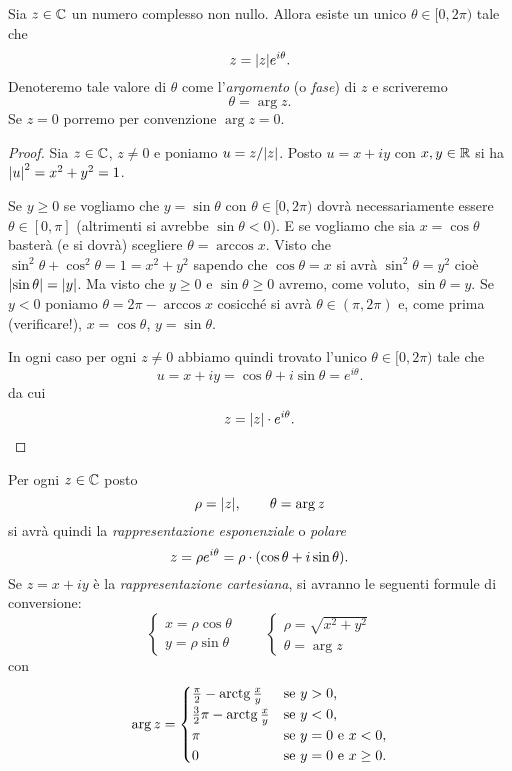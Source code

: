 \begin{theorem}[argomento]
%
Sia $z\in {\mathbb C}$ un numero complesso non nullo. Allora esiste un
unico $\theta\in [0,2\pi)$ tale che
\[
z = {\left|z\right|} e^{i\theta}.
\]
Denoteremo tale valore di $\theta$ come l'\emph{argomento}%
%
(o \emph{fase}) di $z$
e scriveremo
\[
  \theta = \arg z.
\]
Se $z=0$ porremo per convenzione $\arg z=0$.
\end{theorem}
%
\begin{proof}
Sia $z\in {\mathbb C}$, $z\neq 0$ e poniamo $u = z/{\left|z\right|}$.
Posto $u=x+iy$ con $x,y\in {\mathbb R}$ si ha ${\left|u\right|}^2 = x^2+y^2=1$.

Se $y\ge 0$ se vogliamo che $y=\sin \theta$ con $\theta\in [0,2\pi)$
dovrà necessariamente essere $\theta \in [0,\pi]$
(altrimenti si avrebbe $\sin \theta<0$).
E se vogliamo che sia $x=\cos \theta$ basterà (e si dovrà) scegliere
$\theta = \arccos x$.
Visto che $\sin^2 \theta + \cos^2\theta = 1 = x^2 + y^2$
sapendo che $\cos \theta = x$
si avrà
$\sin^2 \theta = y^2$ cioè ${\left|\sin \theta\right|}={\left|y\right|}$.
Ma visto che $y\ge 0$ e $\sin \theta\ge 0$
avremo, come voluto, $\sin \theta = y$.
Se $y<0$ poniamo $\theta = 2\pi - \arccos x$
cosicché si avrà $\theta \in (\pi, 2\pi)$
e, come prima (verificare!),
$x=\cos \theta$, $y=\sin \theta$.

In ogni caso per ogni $z\neq 0$ abbiamo quindi trovato l'unico
$\theta\in [0,2\pi)$ tale che
\[
  u
  = x + i y
  = \cos \theta + i\sin \theta
  = e^{i\theta}.
\]
da cui
\[
  z = {\left|z\right|}\cdot e^{i\theta}.
\]
\end{proof}

Per ogni $z\in {\mathbb C}$ posto
\[
  \rho = {\left|z\right|}, \qquad \theta = \arg z
\]
si avrà quindi la \emph{rappresentazione esponenziale} o \emph{polare}
\[
  z = \rho e^{i\theta} = \rho \cdot {\left( \cos \theta
  + i \sin \theta \right)}.
\]
Se $z=x+iy$ è la \emph{rappresentazione cartesiana}, si avranno
le seguenti formule di conversione:
\[
\begin{cases}
  x = \rho \cos \theta\\
  y = \rho \sin \theta
\end{cases}
\qquad
\begin{cases}
 \rho = \sqrt{x^2+y^2}\\
 \theta = \arg z
\end{cases}
\]
con
\[
  \arg z =
  \begin{cases}
   \frac \pi 2 - \operatorname{arctg} \frac x y & \text{se $y>0$,} \\
   \frac 3 2 \pi- \operatorname{arctg} \frac x y & \text{se $y<0$,} \\
   \pi & \text{se $y=0$ e $x<0$,} \\
   0 & \text{se $y=0$ e $x\ge 0$.}
   \end{cases}
\]

